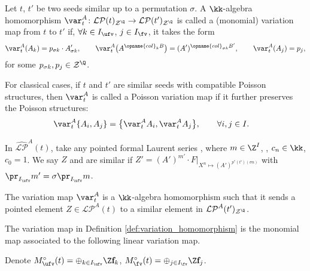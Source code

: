 \documentclass[pdftex]{sigma}
\newcommand{\Mc}{M^\circ}
\newcommand{\Iufv}{I_{\ufv}}
\newcommand{\Ifv}{I_{\fv}}
\newcommand{\LP}{{\mathcal{LP}}}
\newcommand{\fFac}{\mathcal{Z}}
\newcommand{\fFacRoot}{\fFac^{\Q}}
\newcommand{\col}{\opname{col}}
\newcommand{\hLP}{\widehat{\mathcal{LP}}}
\newcommand{\ff}{\mathbf{f}}
\numberwithin{equation}{section}
\begin{document}
\begin{Definition}\label{def:variation_homomorphism} Let $t$, $t'$ be two seeds similar up to a permutation $\sigma$. A $\kk$-algebra homomorphism $\var_{t}^{A}\colon \LP(t)_{\fFacRoot}\rightarrow\LP(t')_{\fFacRoot}$
is called a (monomial) variation map from $t$ to $t'$ if, $\forall k\in\Iufv$,
$j\in\Ifv$, it takes the form
\begin{gather*}
\var_{t}^{A}(A_{k}) = p_{\sigma k}\cdot A_{\sigma k}',\qquad
\var_{t}^{A}\big(A^{\col_{k}B}\big) = (A')^{\col_{\sigma k}B'},\qquad
\var_{t}^{A}(A_{j}) = p_{j},
\end{gather*}
for some $p_{\sigma k},p_{j}\in\fFacRoot$.

For classical cases, if $t$ and $t'$ are similar seeds with compatible Poisson structures, then
$\var_{t}^{A}$ is called a Poisson variation map if it further preserves
the Poisson structures:
\begin{align*}
\var_{t}^{A}\{A_{i},A_{j}\} & =\bigl\{\var_{t}^{A}A_{i},\var_{t}^{A}A_{j}\bigr\},\qquad \forall i,j\in I.
\end{align*}

\end{Definition}

\begin{Definition}
 In $\hLP^A(t)$, take any pointed formal Laurent series , where $m\in \Z^I$, , $c_n\in \kk$, $c_0= 1$. We say $Z$ and \smash{$Z'\in \hLP^A(t')_{\fFacRoot}$} are similar if $Z'=(A')^{m'}\cdot F|_{X^{n}\mapsto (A')^{p^*(t')(\sigma n)}}$ with $\pr_{\Iufv}m'=\sigma \pr_{\Iufv}m$.
\end{Definition}

\begin{Remark}\label{rem:variation_map_pointed_elements}
 The variation map $\var_t^A$ is a $\kk$-algebra homomorphism such that it sends a pointed element $Z\in\LP^A(t)$ to a similar element in $\LP^A(t')_{\fFacRoot}$.
\end{Remark}


The variation map in Definition \ref{def:variation_homomorphism}
is the monomial map associated to the following linear variation map.

Denote $\Mc_{\ufv}(t)=\oplus_{k\in\Iufv}\Z\ff_{k}$, $\Mc_{\fv}(t)=\oplus_{j\in\Ifv}\Z\ff_{j}$.
\end{document}
